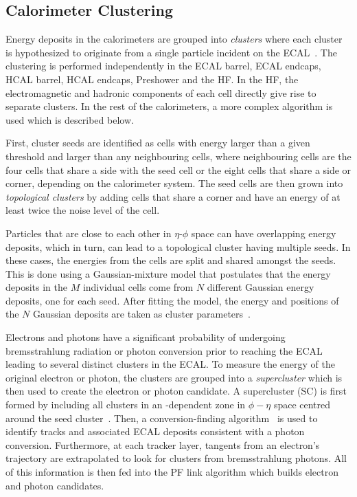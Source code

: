 \subsection{Calorimeter Clustering}\label{sec:calo_clustering}
Energy deposits in the calorimeters are grouped into \textit{clusters} where each cluster is hypothesized to originate from a single particle incident on the ECAL~\cite{CMS:2017yfk}. The clustering is performed independently in the ECAL barrel, ECAL endcaps, HCAL barrel, HCAL endcaps, Preshower and the HF. In the HF, the electromagnetic and hadronic components of each cell directly give rise to separate clusters. In the rest of the calorimeters, a more complex algorithm is used which is described below.

First, cluster seeds are identified as cells with energy larger than a given threshold and larger than any neighbouring cells, where neighbouring cells are the four cells that share a side with the seed cell or the eight cells that share a side or corner, depending on the calorimeter system. The seed cells are then grown into \textit{topological clusters} by adding cells that share a corner and have an energy of at least twice the noise level of the cell. 

Particles that are close to each other in $\eta$-$\phi$ space can have overlapping energy deposits, which in turn, can lead to a topological cluster having multiple seeds. In these cases, the energies from the cells are split and shared amongst the seeds. This is done using a Gaussian-mixture model that postulates that the energy deposits in the $M$ individual cells come from $N$ different Gaussian energy deposits, one for each seed. After fitting the model, the energy and positions of the $N$ Gaussian deposits are taken as cluster parameters~\cite{CMS:2017yfk}.

Electrons and photons have a significant probability of undergoing bremsstrahlung radiation or photon conversion prior to reaching the ECAL leading to several distinct clusters in the ECAL. To measure the energy of the original electron or photon, the clusters are grouped into a \textit{supercluster} which is then used to create the electron or photon candidate. A supercluster (SC) is first formed by including all clusters in an \ET-dependent zone in $\phi-\eta$ space centred around the seed cluster~\cite{CMS:2020uim}. Then, a conversion-finding algorithm~\cite{CMS:2008xjf} is used to identify tracks and associated ECAL deposits consistent with a photon conversion. Furthermore, at each tracker layer, tangents from an electron's trajectory are extrapolated to look for clusters from bremsstrahlung photons. All of this information is then fed into the PF link algorithm which builds electron and photon candidates.